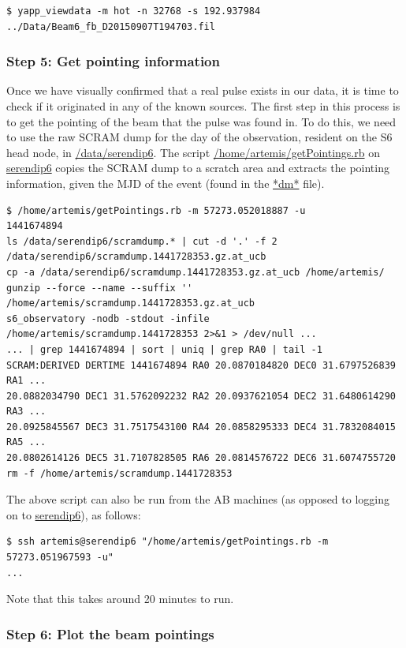 \documentclass{article}
\begin{document}
\small{
\begin{verbatim}
$ yapp_viewdata -m hot -n 32768 -s 192.937984 ../Data/Beam6_fb_D20150907T194703.fil
\end{verbatim}
}

\subsubsection*{Step 5: Get pointing information}

Once we have visually confirmed that a real pulse exists in our data, it is
time to check if it originated in any of the known sources. The first step in
this process is to get the pointing of the beam that the pulse was found in. To
do this, we need to use the raw SCRAM dump for the day of the observation,
resident on the S6 head node, in \url{/data/serendip6}. The script
\url{/home/artemis/getPointings.rb} on \url{serendip6} copies the SCRAM dump to
a scratch area and extracts the pointing information, given the MJD of the
event (found in the \url{*dm*} file).

\small{
\begin{verbatim}
$ /home/artemis/getPointings.rb -m 57273.052018887 -u
1441674894
ls /data/serendip6/scramdump.* | cut -d '.' -f 2
/data/serendip6/scramdump.1441728353.gz.at_ucb
cp -a /data/serendip6/scramdump.1441728353.gz.at_ucb /home/artemis/
gunzip --force --name --suffix '' /home/artemis/scramdump.1441728353.gz.at_ucb
s6_observatory -nodb -stdout -infile /home/artemis/scramdump.1441728353 2>&1 > /dev/null ...
... | grep 1441674894 | sort | uniq | grep RA0 | tail -1
SCRAM:DERIVED DERTIME 1441674894 RA0 20.0870184820 DEC0 31.6797526839 RA1 ...
20.0882034790 DEC1 31.5762092232 RA2 20.0937621054 DEC2 31.6480614290 RA3 ...
20.0925845567 DEC3 31.7517543100 RA4 20.0858295333 DEC4 31.7832084015 RA5 ...
20.0802614126 DEC5 31.7107828505 RA6 20.0814576722 DEC6 31.6074755720
rm -f /home/artemis/scramdump.1441728353
\end{verbatim}
}

The above script can also be run from the AB machines (as opposed to logging on
to \url{serendip6}), as follows:

\small{
\begin{verbatim}
$ ssh artemis@serendip6 "/home/artemis/getPointings.rb -m 57273.051967593 -u"
...
\end{verbatim}
}

Note that this takes around 20 minutes to run.


\subsubsection*{Step 6: Plot the beam pointings}
\end{document}
